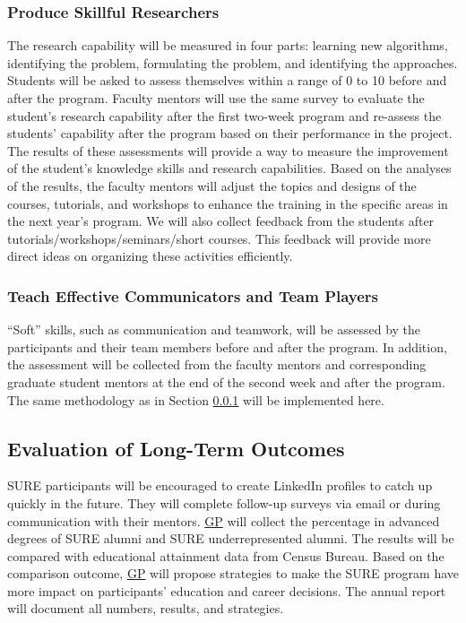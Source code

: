 \documentclass[11pt]{NSFamsart}
\newcommand{\GP}{\hyperlink{GPlink}{GP}\xspace}
\begin{document}
\subsubsection{Produce Skillful Researchers} \label{sec:hardskill}
The research capability will be measured in four parts: learning new algorithms, identifying the problem, formulating the problem, and identifying the approaches.
Students will be asked to assess themselves within a range of 0 to 10 before and after the program. Faculty mentors will use the same survey to evaluate the student's research capability after the first two-week program and re-assess the students’ capability after the program based on their performance in the project.
The results of these assessments will provide a way to measure the improvement of the student's knowledge skills and research capabilities. Based on the analyses of the results, the faculty mentors will adjust the topics and designs of the courses, tutorials,  and workshops to enhance the training in the specific areas in the next year's program.
We will also collect feedback from the students after tutorials/workshops/seminars/short courses. This feedback will provide more direct ideas on organizing these activities efficiently.

\subsubsection{Teach Effective Communicators and Team Players}

``Soft'' skills, such as communication and teamwork, will be assessed by the participants and their team members before and after the program. In addition, the assessment will be collected from the faculty mentors and corresponding graduate student mentors at the end of the second week and after the program. The same methodology as in Section \ref{sec:hardskill} will be implemented here. 




\subsection{Evaluation of Long-Term Outcomes}

SURE participants will be encouraged to create LinkedIn profiles to catch up quickly in the future. They will complete follow-up surveys via email or during communication with their mentors. \GP will collect the percentage in advanced degrees of SURE alumni and SURE underrepresented alumni. The results will be compared with educational attainment data from Census Bureau. Based on the comparison outcome, \GP will propose  strategies to make the SURE program have more impact on participants’ education and career decisions. The annual report will document all numbers, results, and strategies.
\end{document}
